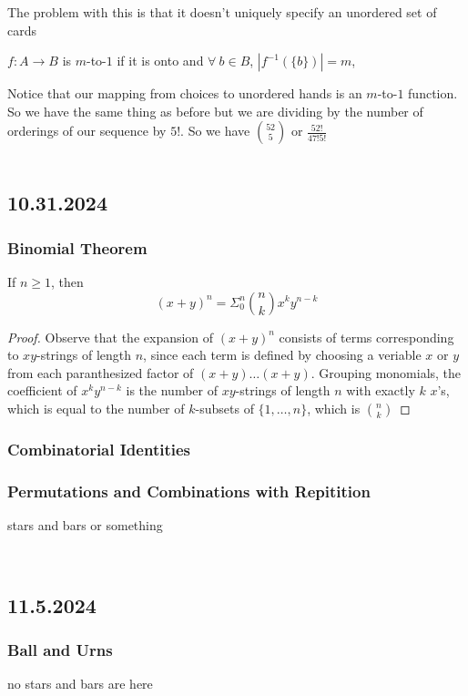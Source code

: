 \documentclass[11pt]{scrartcl}
\begin{document}
The problem with this is that it doesn't uniquely specify an unordered set of cards
\begin{definition}
    $f: A \to B$ is $m$-to-$1$ if it is onto and $\forall~ b \in B$, $|f^{-1}(\{b\})| = m$, 
\end{definition}
Notice that our mapping from choices to unordered hands is an $m$-to-$1$ function.  So we have the same thing as before but we are dividing by the number of orderings of our sequence by $5!$.  So we have $52\choose 5$ or $\frac{52!}{47!5!}$
\\
\\
\subsection{10.31.2024}
\subsubsection{Binomial Theorem}
\begin{theorem}
    If $n \geq 1$, then $$(x+y)^n = \Sigma_0^n {n\choose k} x^ky^{n-k}$$
\end{theorem}
\begin{proof}
    Observe that the expansion of $(x+y)^n$ consists of terms corresponding to $xy$-strings of length $n$, since each term is defined by choosing a veriable $x$ or $y$ from each paranthesized factor of $(x+y) \dots (x+y)$.  Grouping monomials, the coefficient of $x^ky^{n-k}$ is the number of $xy$-strings of length $n$ with exactly $k$ $x$'s, which is equal to the number of $k$-subsets of $\{1, \dots, n\}$, which is ${n \choose k}$
\end{proof}
\subsubsection{Combinatorial Identities}


\subsubsection{Permutations and Combinations with Repitition}
stars and bars or something

\newline
\noindent
\Line
\\
\subsection{11.5.2024}
\subsubsection{Ball and Urns}
no stars and bars are here
\end{document}
